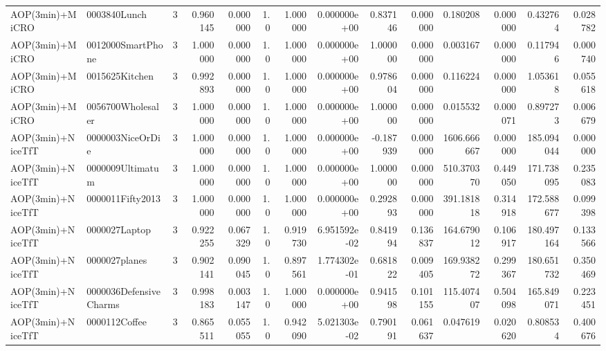 \begin{tabular}{llrr|r|rr|rr|rr|rrr}
          AOP(3min)+MiCRO &           0003840Lunch &       3 & 0.960145 & 0.000000 &  1.0 &      1.000000 & 0.000000e+00 &      0.837146 & 0.000000 &      0.180208 &    0.000000 &     0.432764 &    0.028782 \\
          AOP(3min)+MiCRO &      0012000SmartPhone &       3 & 1.000000 & 0.000000 &  1.0 &      1.000000 & 0.000000e+00 &      1.000000 & 0.000000 &      0.003167 &    0.000000 &     0.117946 &    0.000740 \\
          AOP(3min)+MiCRO &         0015625Kitchen &       3 & 0.992893 & 0.000000 &  1.0 &      1.000000 & 0.000000e+00 &      0.978604 & 0.000000 &      0.116224 &    0.000000 &     1.053618 &    0.055618 \\
          AOP(3min)+MiCRO &      0056700Wholesaler &       3 & 1.000000 & 0.000000 &  1.0 &      1.000000 & 0.000000e+00 &      1.000000 & 0.000000 &      0.015532 &    0.000071 &     0.897273 &    0.006679 \\
        AOP(3min)+NiceTfT &       0000003NiceOrDie &       3 & 1.000000 & 0.000000 &  1.0 &      1.000000 & 0.000000e+00 &     -0.187939 & 0.000000 &   1606.666667 &    0.000000 &   185.094044 &    0.000000 \\
        AOP(3min)+NiceTfT &       0000009Ultimatum &       3 & 1.000000 & 0.000000 &  1.0 &      1.000000 & 0.000000e+00 &      1.000000 & 0.000000 &    510.370370 &    0.449050 &   171.738095 &    0.235083 \\
        AOP(3min)+NiceTfT &       0000011Fifty2013 &       3 & 1.000000 & 0.000000 &  1.0 &      1.000000 & 0.000000e+00 &      0.292893 & 0.000000 &    391.181818 &    0.314918 &   172.588677 &    0.099398 \\
        AOP(3min)+NiceTfT &          0000027Laptop &       3 & 0.922255 & 0.067329 &  1.0 &      0.919730 & 6.951592e-02 &      0.841994 & 0.136837 &    164.679012 &    0.106917 &   180.497164 &    0.133566 \\
        AOP(3min)+NiceTfT &          0000027planes &       3 & 0.902141 & 0.090045 &  1.0 &      0.897561 & 1.774302e-01 &      0.681822 & 0.009405 &    169.938272 &    0.299367 &   180.651732 &    0.350469 \\
        AOP(3min)+NiceTfT & 0000036DefensiveCharms &       3 & 0.998183 & 0.003147 &  1.0 &      1.000000 & 0.000000e+00 &      0.941598 & 0.101155 &    115.407407 &    0.504098 &   165.849071 &    0.223451 \\
        AOP(3min)+NiceTfT &          0000112Coffee &       3 & 0.865511 & 0.055055 &  1.0 &      0.942090 & 5.021303e-02 &      0.790191 & 0.061637 &      0.047619 &    0.020620 &     0.808534 &    0.400676 \\

\end{tabular}
